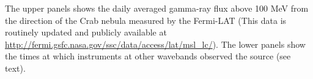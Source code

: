 The upper panels shows the daily averaged gamma-ray flux above 100 MeV from the direction of the Crab nebula measured by the Fermi-LAT (This data is routinely updated and publicly available at \url{http://fermi.gsfc.nasa.gov/ssc/data/access/lat/msl_lc/}). The lower panels show the times at which instruments at other wavebands observed the source (see text).\label{fig:lc}